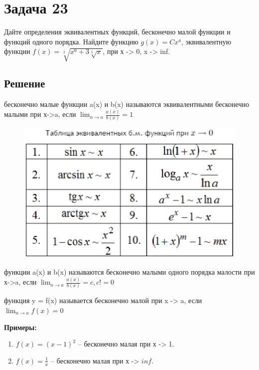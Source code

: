 \section*{Задача 23}

Дайте определения эквивалентных функций, бесконечно малой функции и функций одного порядка. Найдите функцию $g(x) = Cx^a$, эквивалентную функции $f(x)= \sqrt[3]{x^6+3\sqrt[5]{x}}$, при х -> 0, x -> inf.

\subsection*{Решение}

\begin{defi} бесконечно малые функции a(x) и b(x) называются эквивалентными бесконечно малыми при х->a, если
$\displaystyle \lim_{n\rightarrow a}
               \frac{a(x)}{b(x)}
               =1
$ 
\end{defi}
\begin{figure}[h!]
\includegraphics[width=1\linewidth]{_PNG}
\end{figure}
\clearpage
\begin{defi}  функции a(x) и b(x) называются бесконечно малыми одного порядка малости при х->a, если
$\displaystyle \lim_{n\rightarrow a} 
               \frac{a(x)}{b(x)}
               =c, c != 0
$              

\end{defi}
\begin{defi} функция y = f(x) называется бесконечно малой при x -> a, если
$\displaystyle \lim_{n\rightarrow a} 
               f(x) = 0
$
             
\end{defi}

\textbf{Примеры:}
    \begin{enumerate}
        \item $f(x) = (x-1)^2$ -- бесконечно малая при х -> 1.
         \item $f(x) = \frac{1}{x}$ -- бесконечно малая при х -> $inf$.
    \end{enumerate}


